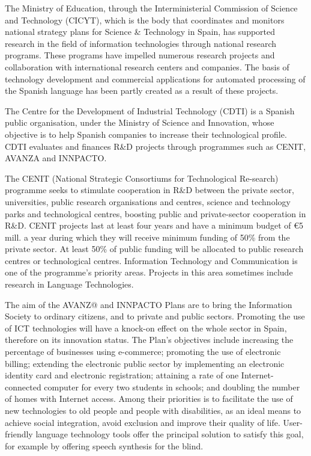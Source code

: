 \begin{multicols}{2}
The Ministry of Education, through the Interministerial Commission of Science and Technology (CICYT), which is the body that coordinates and monitors national strategy plans for Science \& Technology in Spain, has supported research in the field of information technologies through national research programs. These programs have impelled numerous research projects and collaboration with international research centers and companies. The basis of technology development and commercial applications for automated processing of the Spanish language has been partly created as a result of these projects.

The Centre for the Development of Industrial Technology (CDTI) is a Spanish public organisation, under the Ministry of Science and Innovation, whose objective is to help Spanish companies to increase their technological profile. CDTI evaluates and finances R\&D projects through programmes such as CENIT, AVANZA and INNPACTO.

The CENIT (National Strategic Consortiums for Technological Re-search) programme seeks to stimulate cooperation in R\&D between the private sector, universities, public research organisations and centres, science and technology parks and technological centres, boosting public and private-sector cooperation in R\&D. CENIT projects last at least four years and have a minimum budget of €5 mill. a year during which they will receive minimum funding of 50\% from the private sector. At least 50\% of public funding will be allocated to public research centres or technological centres. Information Technology and Communication is one of the programme’s priority areas. Projects in this area sometimes include research in Language Technologies. 

The aim of the AVANZ@ and INNPACTO Plans are to bring the Information Society to ordinary citizens, and to private and public sectors. Promoting the use of ICT technologies will have a knock-on effect on the whole sector in Spain, therefore on its innovation status. The Plan’s objectives include increasing the percentage of businesses using e-commerce; promoting the use of electronic billing; extending the electronic public sector by implementing an electronic identity card and electronic registration; attaining a rate of one Internet-connected computer for every two students in schools; and doubling the number of homes with Internet access. Among their priorities is to facilitate the use of new technologies to old people and people with disabilities, as an ideal means to achieve social integration, avoid exclusion and improve their quality of life. User-friendly language technology tools offer the principal solution to satisfy this goal, for example by offering speech synthesis for the blind.


\end{multicols}
